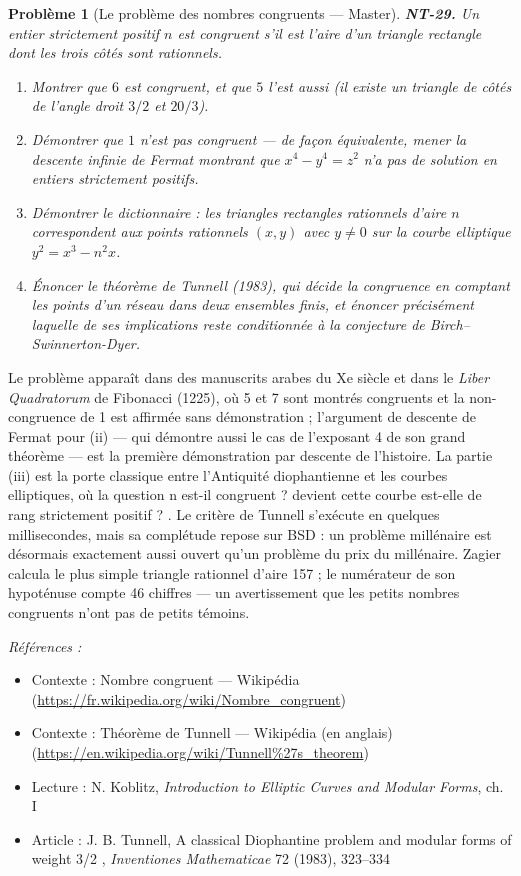 \documentclass[11pt]{article}
\newtheorem{problem}{Problème}
\newenvironment{refs}{\par\small\noindent\emph{Références :}\begin{itemize}\setlength\itemsep{0pt}}{\end{itemize}\normalsize}
\begin{document}
\begin{problem}[{Le problème des nombres congruents --- Master}]
\textbf{NT-29.} Un entier strictement positif $n$ est \textit{congruent} s'il
est l'aire d'un triangle rectangle dont les trois côtés sont rationnels.
\begin{enumerate}
\item[(i)] Montrer que $6$ est
congruent, et que $5$ l'est aussi (il existe un triangle de côtés de l'angle droit $3/2$ et
$20/3$).
\item[(ii)] Démontrer que $1$ n'est pas congruent --- de façon équivalente, mener la descente
infinie de Fermat montrant que $x^4 - y^4 = z^2$ n'a pas de solution en entiers strictement
positifs.
\item[(iii)] Démontrer le dictionnaire : les triangles rectangles rationnels d'aire $n$
correspondent aux points rationnels $(x, y)$ avec $y \ne 0$ sur la courbe elliptique
$y^2 = x^3 - n^2 x$.
\item[(iv)] Énoncer le théorème de Tunnell (1983), qui décide la congruence en
comptant les points d'un réseau dans deux ensembles finis, et énoncer précisément laquelle de ses
implications reste conditionnée à la conjecture de Birch--Swinnerton-Dyer.
\end{enumerate}

\end{problem}

\noindent Le problème apparaît dans des manuscrits arabes du Xe siècle et dans le
\textit{Liber Quadratorum} de Fibonacci (1225), où 5 et 7 sont montrés congruents et la
non-congruence de 1 est affirmée sans démonstration ; l'argument de descente de Fermat pour (ii) ---
qui démontre aussi le cas de l'exposant 4 de son grand théorème --- est la première démonstration par
descente de l'histoire. La partie (iii) est la porte classique entre l'Antiquité diophantienne et les
courbes elliptiques, où la question \og{} n est-il congruent ? \fg{} devient \og{} cette courbe est-elle de rang
strictement positif ? \fg{}. Le critère de Tunnell s'exécute en quelques millisecondes, mais sa
complétude repose sur BSD : un problème millénaire est désormais exactement aussi ouvert qu'un
problème du prix du millénaire. Zagier calcula le plus simple triangle rationnel d'aire 157 ; le
numérateur de son hypoténuse compte 46 chiffres --- un avertissement que les \og{} petits \fg{} nombres
congruents n'ont pas de petits témoins.

\begin{refs}
\item Contexte : Nombre congruent --- Wikipédia (\url{https://fr.wikipedia.org/wiki/Nombre_congruent})
\item Contexte : Théorème de Tunnell --- Wikipédia (en anglais) (\url{https://en.wikipedia.org/wiki/Tunnell%27s_theorem})
\item Lecture : N. Koblitz, \textit{Introduction to Elliptic Curves and Modular Forms}, ch. I
\item Article : J. B. Tunnell, \og{} A classical Diophantine problem and modular forms of weight 3/2 \fg{}, \textit{Inventiones Mathematicae} 72 (1983), 323--334
\end{refs}
\end{document}
